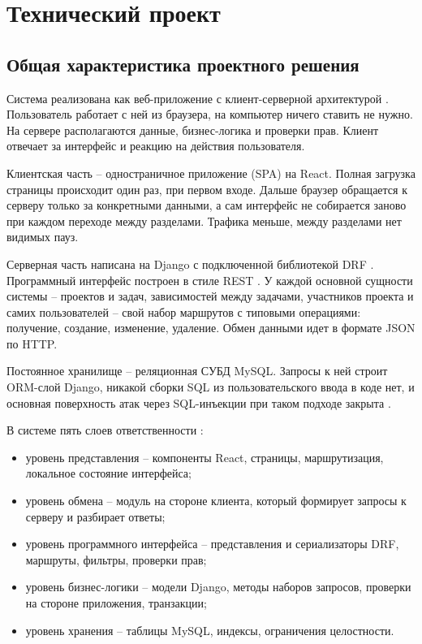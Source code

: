 \section{Технический проект}

\subsection{Общая характеристика проектного решения}

Система реализована как веб-приложение с клиент-серверной архитектурой \cite{art_client_server}. Пользователь работает с ней из браузера, на компьютер ничего ставить не нужно. На сервере располагаются данные, бизнес-логика и проверки прав. Клиент отвечает за интерфейс и реакцию на действия пользователя.

Клиентская часть -- одностраничное приложение (SPA) на React. Полная загрузка страницы происходит один раз, при первом входе. Дальше браузер обращается к серверу только за конкретными данными, а сам интерфейс не собирается заново при каждом переходе между разделами. Трафика меньше, между разделами нет видимых пауз.

Серверная часть написана на Django с подключенной библиотекой DRF \cite{drf_docs}. Программный интерфейс построен в стиле REST \cite{art_rest, rfc9110}. У каждой основной сущности системы -- проектов и задач, зависимостей между задачами, участников проекта и самих пользователей -- свой набор маршрутов с типовыми операциями: получение, создание, изменение, удаление. Обмен данными идет в формате JSON по HTTP.

Постоянное хранилище -- реляционная СУБД MySQL. Запросы к ней строит ORM-слой Django, никакой сборки SQL из пользовательского ввода в коде нет, и основная поверхность атак через SQL-инъекции при таком подходе закрыта \cite{owasp_top10}.

В системе пять слоев ответственности \cite{fowler_patterns}:
\begin{itemize}
    \item уровень представления -- компоненты React, страницы, маршрутизация, локальное состояние интерфейса;
    \item уровень обмена -- модуль на стороне клиента, который формирует запросы к серверу и разбирает ответы;
    \item уровень программного интерфейса -- представления и сериализаторы DRF, маршруты, фильтры, проверки прав;
    \item уровень бизнес-логики -- модели Django, методы наборов запросов, проверки на стороне приложения, транзакции;
    \item уровень хранения -- таблицы MySQL, индексы, ограничения целостности.
\end{itemize}

